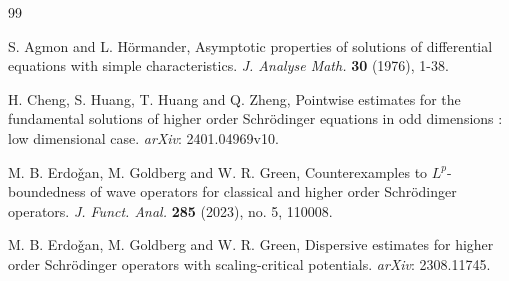 \documentclass[11pt,reqno]{amsart}
\numberwithin{equation}{section}
\theoremstyle{definition}
\begin{document}
\begin{thebibliography}{99}




 S. Agmon and L. H\"{o}rmander, Asymptotic properties of solutions of differential equations with simple characteristics. \textit{J. Analyse Math.} \textbf{30} (1976), 1-38.




 H. Cheng, S. Huang, T. Huang and Q. Zheng, Pointwise estimates for the fundamental solutions of higher order Schr\"{o}dinger equations in odd dimensions \uppercase\expandafter{}: low dimensional case. \textit{arXiv}: 2401.04969v10.









  M. B. Erdo\v{g}an, M. Goldberg and W. R. Green, Counterexamples to $L^p$-boundedness of wave operators for classical and higher order Schr\"{o}dinger operators. \textit{J. Funct. Anal.} \textbf{285} (2023), no. 5, 110008.

   M. B. Erdo\v{g}an, M. Goldberg and W. R. Green, Dispersive estimates for higher order Schr\"{o}dinger operators with scaling-critical potentials.  \textit{arXiv}: 2308.11745.


\end{thebibliography}
\end{document}
